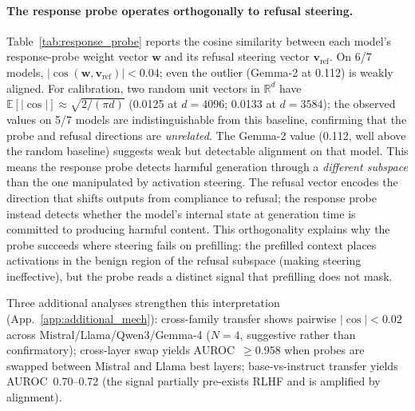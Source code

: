 \documentclass{article}
\begin{document}
\paragraph{The response probe operates orthogonally to refusal steering.}
Table~\ref{tab:response_probe} reports the cosine similarity between each model's response-probe weight vector $\mathbf{w}$ and its refusal steering vector $\mathbf{v}_\text{ref}$. On 6/7 models, $|\cos(\mathbf{w}, \mathbf{v}_\text{ref})| < 0.04$; even the outlier (Gemma-2 at 0.112) is weakly aligned. For calibration, two random unit vectors in $\mathbb{R}^{d}$ have $\mathbb{E}[|\cos|]\approx\sqrt{2/(\pi d)}$ (0.0125 at $d=4096$; 0.0133 at $d=3584$); the observed values on 5/7 models are indistinguishable from this baseline, confirming that the probe and refusal directions are \emph{unrelated}. The Gemma-2 value (0.112, well above the random baseline) suggests weak but detectable alignment on that model. This means the response probe detects harmful generation through a \emph{different subspace} than the one manipulated by activation steering. The refusal vector encodes the direction that shifts outputs from compliance to refusal; the response probe instead detects whether the model's internal state at generation time is committed to producing harmful content. This orthogonality explains why the probe succeeds where steering fails on prefilling: the prefilled context places activations in the benign region of the refusal subspace (making steering ineffective), but the probe reads a distinct signal that prefilling does not mask.

Three additional analyses strengthen this interpretation (App.~\ref{app:additional_mech}): cross-family transfer shows pairwise $|\cos|<0.02$ across Mistral/Llama/Qwen3/Gemma-4 ($N=4$, suggestive rather than confirmatory); cross-layer swap yields AUROC~$\geq 0.958$ when probes are swapped between Mistral and Llama best layers; base-vs-instruct transfer yields AUROC~0.70--0.72 (the signal partially pre-exists RLHF and is amplified by alignment).
\end{document}
